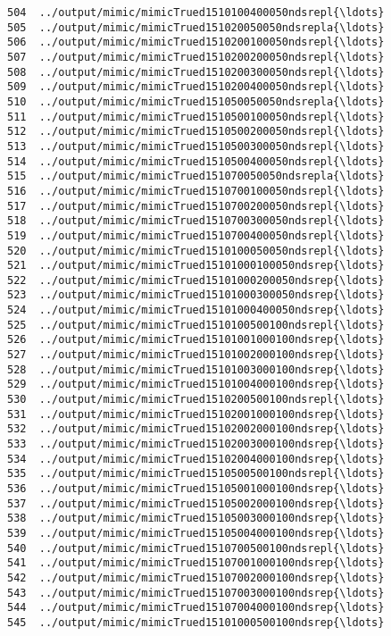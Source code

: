 \documentclass[11pt]{article}
\begin{document}
\begin{Verbatim}[commandchars=\\\{\}]
504  ../output/mimic/mimicTrued1510100400050ndsrepl{\ldots}  
505  ../output/mimic/mimicTrued151020050050ndsrepla{\ldots}  
506  ../output/mimic/mimicTrued1510200100050ndsrepl{\ldots}  
507  ../output/mimic/mimicTrued1510200200050ndsrepl{\ldots}  
508  ../output/mimic/mimicTrued1510200300050ndsrepl{\ldots}  
509  ../output/mimic/mimicTrued1510200400050ndsrepl{\ldots}  
510  ../output/mimic/mimicTrued151050050050ndsrepla{\ldots}  
511  ../output/mimic/mimicTrued1510500100050ndsrepl{\ldots}  
512  ../output/mimic/mimicTrued1510500200050ndsrepl{\ldots}  
513  ../output/mimic/mimicTrued1510500300050ndsrepl{\ldots}  
514  ../output/mimic/mimicTrued1510500400050ndsrepl{\ldots}  
515  ../output/mimic/mimicTrued151070050050ndsrepla{\ldots}  
516  ../output/mimic/mimicTrued1510700100050ndsrepl{\ldots}  
517  ../output/mimic/mimicTrued1510700200050ndsrepl{\ldots}  
518  ../output/mimic/mimicTrued1510700300050ndsrepl{\ldots}  
519  ../output/mimic/mimicTrued1510700400050ndsrepl{\ldots}  
520  ../output/mimic/mimicTrued1510100050050ndsrepl{\ldots}  
521  ../output/mimic/mimicTrued15101000100050ndsrep{\ldots}  
522  ../output/mimic/mimicTrued15101000200050ndsrep{\ldots}  
523  ../output/mimic/mimicTrued15101000300050ndsrep{\ldots}  
524  ../output/mimic/mimicTrued15101000400050ndsrep{\ldots}  
525  ../output/mimic/mimicTrued1510100500100ndsrepl{\ldots}  
526  ../output/mimic/mimicTrued15101001000100ndsrep{\ldots}  
527  ../output/mimic/mimicTrued15101002000100ndsrep{\ldots}  
528  ../output/mimic/mimicTrued15101003000100ndsrep{\ldots}  
529  ../output/mimic/mimicTrued15101004000100ndsrep{\ldots}  
530  ../output/mimic/mimicTrued1510200500100ndsrepl{\ldots}  
531  ../output/mimic/mimicTrued15102001000100ndsrep{\ldots}  
532  ../output/mimic/mimicTrued15102002000100ndsrep{\ldots}  
533  ../output/mimic/mimicTrued15102003000100ndsrep{\ldots}  
534  ../output/mimic/mimicTrued15102004000100ndsrep{\ldots}  
535  ../output/mimic/mimicTrued1510500500100ndsrepl{\ldots}  
536  ../output/mimic/mimicTrued15105001000100ndsrep{\ldots}  
537  ../output/mimic/mimicTrued15105002000100ndsrep{\ldots}  
538  ../output/mimic/mimicTrued15105003000100ndsrep{\ldots}  
539  ../output/mimic/mimicTrued15105004000100ndsrep{\ldots}  
540  ../output/mimic/mimicTrued1510700500100ndsrepl{\ldots}  
541  ../output/mimic/mimicTrued15107001000100ndsrep{\ldots}  
542  ../output/mimic/mimicTrued15107002000100ndsrep{\ldots}  
543  ../output/mimic/mimicTrued15107003000100ndsrep{\ldots}  
544  ../output/mimic/mimicTrued15107004000100ndsrep{\ldots}  
545  ../output/mimic/mimicTrued15101000500100ndsrep{\ldots}  

\end{Verbatim}
\end{document}
